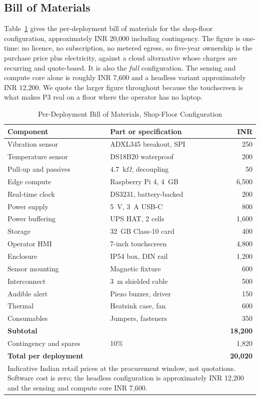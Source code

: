 \documentclass[conference]{IEEEtran}
\begin{document}
\subsection{Bill of Materials}

Table~\ref{tab:bom} gives the per-deployment bill of materials for the
shop-floor configuration, approximately INR 20,000 including contingency.
The figure is one-time: no licence, no subscription, no metered egress, so
five-year ownership is the purchase price plus electricity, against a cloud
alternative whose charges are recurring and quote-based. It is also the
\emph{full} configuration. The sensing and compute core alone is roughly
INR 7,600 and a headless variant approximately INR 12,200. We quote the
larger figure throughout because the touchscreen is what makes P3 real on a
floor where the operator has no laptop.

\begin{table}[t]
\caption{Per-Deployment Bill of Materials, Shop-Floor Configuration}
\label{tab:bom}
\centering
\footnotesize
\setlength{\tabcolsep}{3pt}
\begin{tabular}{|p{2.9cm}|p{2.6cm}|r|}
\hline
\textbf{Component} & \textbf{Part or specification} & \textbf{INR} \\
\hline
Vibration sensor & ADXL345 breakout, SPI & 250 \\
Temperature sensor & DS18B20 waterproof & 200 \\
Pull-up and passives & 4.7~k$\Omega$, decoupling & 50 \\
Edge compute & Raspberry Pi 4, 4~GB & 6,500 \\
Real-time clock & DS3231, battery-backed & 200 \\
Power supply & 5~V, 3~A USB-C & 800 \\
Power buffering & UPS HAT, 2 cells & 1,600 \\
Storage & 32~GB Class-10 card & 400 \\
Operator HMI & 7-inch touchscreen & 4,800 \\
Enclosure & IP54 box, DIN rail & 1,200 \\
Sensor mounting & Magnetic fixture & 600 \\
Interconnect & 3~m shielded cable & 500 \\
Audible alert & Piezo buzzer, driver & 150 \\
Thermal & Heatsink case, fan & 600 \\
Consumables & Jumpers, fasteners & 350 \\
\hline
\textbf{Subtotal} & & \textbf{18,200} \\
Contingency and spares & 10\% & 1,820 \\
\hline
\textbf{Total per deployment} & & \textbf{20,020} \\
\hline
\multicolumn{3}{p{0.95\columnwidth}}{\scriptsize Indicative Indian retail
prices at the procurement window, not quotations. Software cost is zero;
the headless configuration is approximately INR 12,200 and the sensing and
compute core INR 7,600.} \\
\end{tabular}
\end{table}
\end{document}
